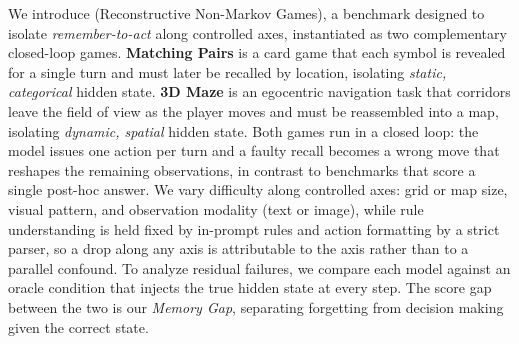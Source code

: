 We introduce \benchname{} (Reconstructive Non-Markov Games), a benchmark designed to isolate \emph{remember-to-act} along controlled axes, instantiated as two complementary closed-loop games. \textbf{Matching Pairs} is a card game that each symbol is revealed for a single turn and must later be recalled by location, isolating \emph{static, categorical} hidden state. \textbf{3D Maze} is an egocentric navigation task that corridors leave the field of view as the player moves and must be reassembled into a map, isolating \emph{dynamic, spatial} hidden state. Both games run in a closed loop: the model issues one action per turn and a faulty recall becomes a wrong move that reshapes the remaining observations, in contrast to benchmarks that score a single post-hoc answer. We vary difficulty along controlled axes: grid or map size, visual pattern, and observation modality (text or image), while rule understanding is held fixed by in-prompt rules and action formatting by a strict parser, so a drop along any axis is attributable to the axis rather than to a parallel confound. To analyze residual failures, we compare each model against an oracle condition that injects the true hidden state at every step. The score gap between the two is our \emph{Memory Gap}, separating forgetting from decision making given the correct state.

